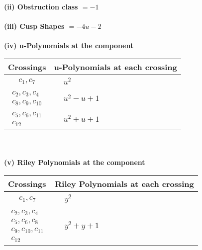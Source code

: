 \documentclass[1p]{elsarticle_modified}
\theoremstyle{definition}
\begin{document}
\flushleft \textbf{(ii) Obstruction class $= -1$}\\~\\
\flushleft \textbf{(iii) Cusp Shapes $= -4 u-2$}\\~\\
\newpage\renewcommand{\arraystretch}{1}
\flushleft \textbf{(iv) u-Polynomials at the component}\newline \\
\begin{tabular}{m{50pt}|m{274pt}}
Crossings & \hspace{64pt}u-Polynomials at each crossing \\
\hline $$\begin{aligned}c_{1},c_{7}\end{aligned}$$&$\begin{aligned}
&u^2
\end{aligned}$\\
\hline $$\begin{aligned}c_{2},c_{3},c_{4}\\c_{8},c_{9},c_{10}\end{aligned}$$&$\begin{aligned}
&u^2- u+1
\end{aligned}$\\
\hline $$\begin{aligned}c_{5},c_{6},c_{11}\\c_{12}\end{aligned}$$&$\begin{aligned}
&u^2+u+1
\end{aligned}$\\
\hline
\end{tabular}\\~\\
\newpage\renewcommand{\arraystretch}{1}
\flushleft \textbf{(v) Riley Polynomials at the component}\newline \\
\begin{tabular}{m{50pt}|m{274pt}}
Crossings & \hspace{64pt}Riley Polynomials at each crossing \\
\hline $$\begin{aligned}c_{1},c_{7}\end{aligned}$$&$\begin{aligned}
&y^2
\end{aligned}$\\
\hline $$\begin{aligned}c_{2},c_{3},c_{4}\\c_{5},c_{6},c_{8}\\c_{9},c_{10},c_{11}\\c_{12}\end{aligned}$$&$\begin{aligned}
&y^2+y+1
\end{aligned}$\\
\hline
\end{tabular}\\~\\
\end{document}
